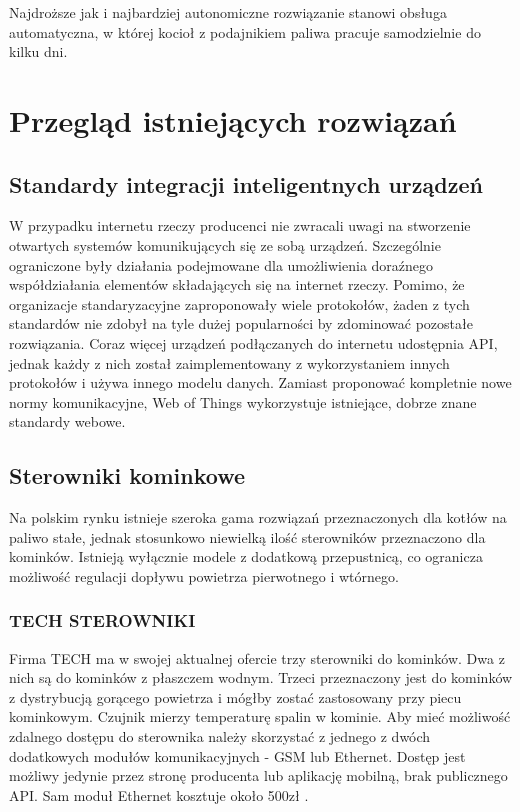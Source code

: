 \documentclass[11pt]{report}
\begin{document}
 Najdroższe jak i najbardziej autonomiczne rozwiązanie stanowi obsługa automatyczna, w której kocioł z podajnikiem paliwa pracuje samodzielnie do kilku dni.
 
 
 \chapter{Przegląd istniejących rozwiązań}\label{ch:przeglad}
 \section{Standardy integracji inteligentnych urządzeń}
 W przypadku internetu rzeczy producenci nie zwracali uwagi na stworzenie otwartych systemów komunikujących się ze sobą urządzeń. Szczególnie ograniczone były działania  podejmowane dla umożliwienia doraźnego współdziałania elementów składających się na internet rzeczy. Pomimo, że organizacje standaryzacyjne zaproponowały wiele protokołów, żaden z tych standardów nie zdobył na tyle dużej popularności by zdominować pozostałe rozwiązania. Coraz więcej urządzeń podłączanych do internetu udostępnia API, jednak każdy z nich został zaimplementowany z wykorzystaniem innych protokołów i używa innego modelu danych. Zamiast proponować kompletnie nowe normy komunikacyjne, Web of Things wykorzystuje istniejące, dobrze znane standardy webowe.
  
 \section{Sterowniki kominkowe}
 Na polskim rynku istnieje szeroka gama rozwiązań przeznaczonych dla kotłów na paliwo stałe, jednak stosunkowo niewielką ilość sterowników przeznaczono dla kominków. Istnieją wyłącznie modele z dodatkową przepustnicą, co ogranicza możliwość regulacji dopływu powietrza pierwotnego i wtórnego.
 \subsection{TECH STEROWNIKI}
 Firma TECH ma w swojej aktualnej ofercie \cite{Tech} trzy sterowniki do kominków. Dwa z nich są do kominków z płaszczem wodnym. Trzeci \cite{TechSterownik} przeznaczony jest do kominków z dystrybucją gorącego powietrza i mógłby zostać zastosowany przy piecu kominkowym. Czujnik mierzy temperaturę spalin w kominie.
 Aby mieć możliwość zdalnego dostępu do sterownika należy skorzystać z jednego z dwóch dodatkowych modułów komunikacyjnych - GSM lub Ethernet. Dostęp jest możliwy jedynie przez stronę producenta lub aplikację mobilną, brak publicznego API.
 Sam moduł Ethernet kosztuje około 500zł \cite{TechEthernetCena}.
\end{document}
